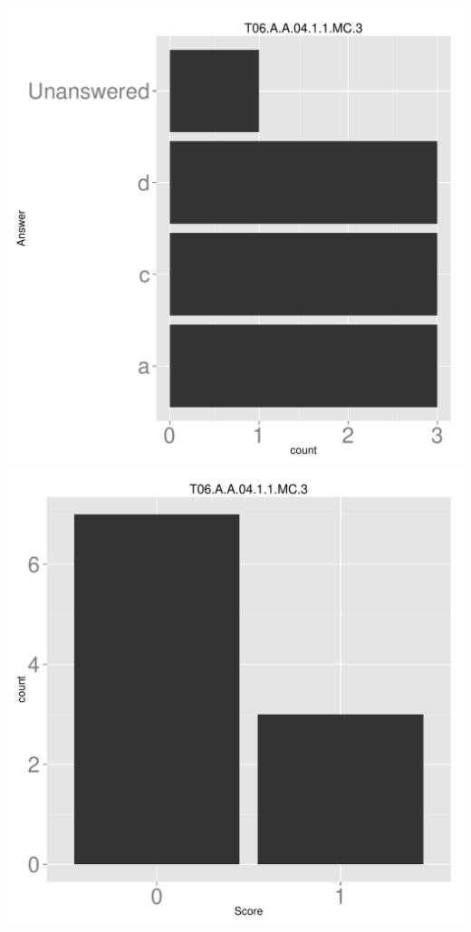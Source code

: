 \documentclass[12pt,english,nohyper]{tufte-handout}\usepackage[]{graphicx}\usepackage[]{color}
\begin{document}
\begin{center} \includegraphics[width=.45\linewidth]{Topic06_AB_3_answer} \includegraphics[width=.45\linewidth]{Topic06_AB_3_score} \end{center} 
\end{document}
